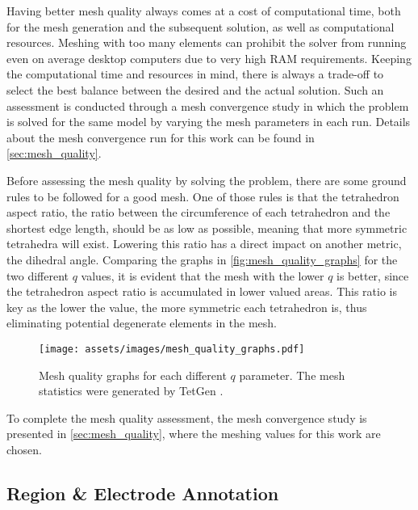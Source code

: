 Having better mesh quality always comes at a cost of computational time, both for the mesh generation and the subsequent solution, as well as computational resources. Meshing with too many elements can prohibit the solver from running even on average desktop computers due to very high \gls{RAM} requirements. Keeping the computational time and resources in mind, there is always a trade-off to select the best balance between the desired and the actual solution. Such an assessment is conducted through a mesh convergence study in which the problem is solved for the same model by varying the mesh parameters in each run. Details about the mesh convergence run for this work can be found in \ref{sec:mesh_quality}.

Before assessing the mesh quality by solving the problem, there are some ground rules to be followed for a good mesh. One of those rules is that the \gls{tetrahedron aspect ratio}, the ratio between the circumference of each tetrahedron and the shortest edge length, should be as low as possible, meaning that more symmetric tetrahedra will exist. Lowering this ratio has a direct impact on another metric, the dihedral angle. Comparing the graphs in \autoref{fig:mesh_quality_graphs} for the two different $q$ values, it is evident that the mesh with the lower $q$ is better, since the \gls{tetrahedron aspect ratio} is accumulated in lower valued areas. This ratio is key as the lower the value, the more symmetric each tetrahedron is, thus eliminating potential degenerate elements in the mesh.

\begin{figure}[H]
    \centering
    \texttt{[image: assets/images/mesh\_quality\_graphs.pdf]}
    \caption[Mesh quality graphs for each different $q$ parameter]{Mesh quality graphs for each different $q$ parameter. The mesh statistics were generated by TetGen \cite{tetgen}.}
    \label{fig:mesh_quality_graphs}
\end{figure}

To complete the mesh quality assessment, the mesh convergence study is presented in \autoref{sec:mesh_quality}, where the meshing values for this work are chosen.

\subsection{Region \& Electrode Annotation}
\label{subsec:elec_annotation}

